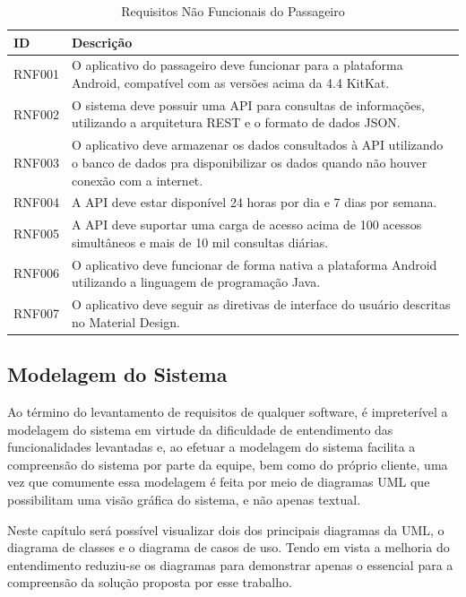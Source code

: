 {{{{\renewcommand{\arraystretch}{2}
\begin{table}[H]
\centering
\caption{Requisitos Não Funcionais do Passageiro}
\label{tab:passageiro-requisitos-nao-funcionais}
\begin{tabular}{ l | p{13.5cm} }
\hline
\textbf{ID} & \textbf{Descrição} \\
\hline
RNF001 & O aplicativo do passageiro deve funcionar para a plataforma Android, compatível com as versões acima da 4.4 KitKat. \\ \hline
RNF002 & O sistema deve possuir uma API para consultas de informações, utilizando a arquitetura REST e o formato de dados JSON. \\ \hline
RNF003 & O aplicativo deve armazenar os dados consultados à API utilizando o banco de dados pra disponibilizar os dados quando não houver conexão com a internet. \\ \hline
RNF004 & A API deve estar disponível 24 horas por dia e 7 dias por semana. \\ \hline
RNF005 & A API deve suportar uma carga de acesso acima de 100 acessos simultâneos e mais de 10 mil consultas diárias. \\ \hline
RNF006 & O aplicativo deve funcionar de forma nativa a plataforma Android utilizando a linguagem de programação Java. \\ \hline
RNF007 & O aplicativo deve seguir as diretivas de interface do usuário descritas no Material Design\footnotemark. \\ \hline
\end{tabular}
\end{table}


\subsection{Modelagem do Sistema}

Ao término do levantamento de requisitos de qualquer software, é impreterível a modelagem do sistema em virtude da dificuldade de entendimento das funcionalidades levantadas e, ao efetuar a modelagem do sistema facilita a compreensão do sistema por parte da equipe, bem como do próprio cliente, uma vez que comumente essa modelagem é feita por meio de diagramas UML que possibilitam uma visão gráfica do sistema, e não apenas textual.

Neste capítulo será possível visualizar dois dos principais diagramas da UML, o diagrama de classes e o diagrama de casos de uso. Tendo em vista a melhoria do entendimento reduziu-se os diagramas para demonstrar apenas o essencial para a compreensão da solução proposta por esse trabalho.

}}}}
